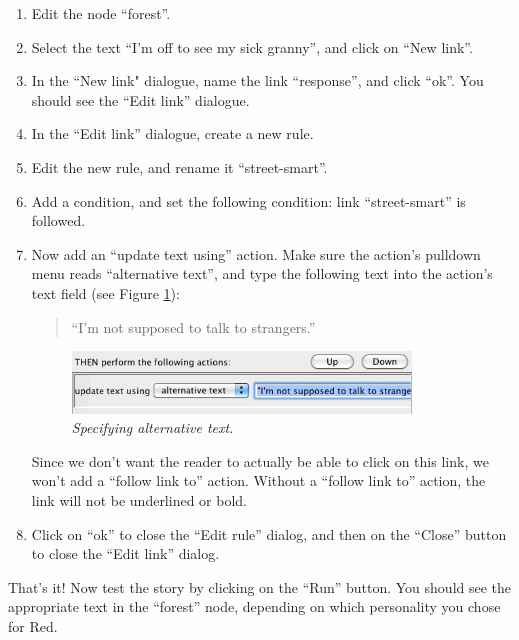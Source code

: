\documentclass{article}
\begin{document}
\begin{enumerate}
  \item Edit the node ``forest''.
  \item Select the text ``I'm off to see my sick granny'', and click on
  ``New link''.
  \item In the ``New link" dialogue, name the link ``response'', and click
  ``ok''. You should see the ``Edit link'' dialogue.
  \item In the ``Edit link'' dialogue, create a new rule.
  \item Edit the new rule, and rename it ``street-smart''.
  \item Add a condition, and set the following condition: link ``street-smart''
  is followed.
  \item Now add an ``update text using'' action. Make sure the action's
  pulldown menu reads ``alternative text'', and type the following text into
  the action's text field (see Figure \ref{fig:tut2:alttext}):
  \begin{quotation}
  \noindent ``I'm not supposed to talk to strangers.''
  \end{quotation}

\begin{figure}[h]
  \centering
  \includegraphics[width=9cm]{images/hypedyn-tutorial-2-figure-8}
  \caption{\textit{Specifying alternative text.}}
  \label{fig:tut2:alttext}
\end{figure} 

  Since we don't want the reader to actually be able to click on this
  link, we won't add a ``follow link to'' action. Without a ``follow link to''
  action, the link will not be underlined or bold.
  \item Click on ``ok'' to close the ``Edit rule'' dialog, and then on the
  ``Close'' button to close the ``Edit link'' dialog.
\end{enumerate}

That's it! Now test the story by clicking on the ``Run'' button. You should see
the appropriate text in the ``forest'' node, depending on which personality you
chose for Red.
\end{document}
